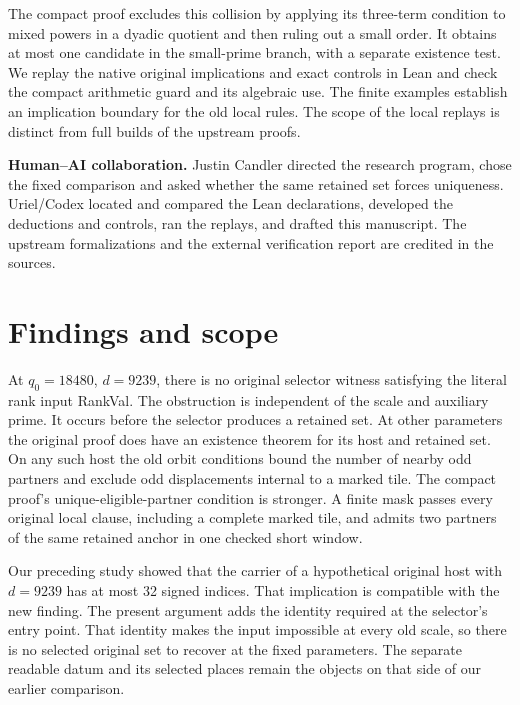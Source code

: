 \documentclass[12pt,letterpaper]{article}
\DeclareRobustCommand{\id}[1]{\mbox{\small\ttfamily #1}}
\begin{document}
The compact proof excludes this collision by applying its three-term condition to mixed powers in a dyadic quotient and then ruling out a small order. It obtains at most one candidate in the small-prime branch, with a separate existence test. We replay the native original implications and exact controls in Lean and check the compact arithmetic guard and its algebraic use. The finite examples establish an implication boundary for the old local rules. The scope of the local replays is distinct from full builds of the upstream proofs.

\medskip
\textbf{Human--AI collaboration.} Justin Candler directed the research program, chose the fixed comparison and asked whether the same retained set forces uniqueness. Uriel/Codex located and compared the Lean declarations, developed the deductions and controls, ran the replays, and drafted this manuscript. The upstream formalizations and the external verification report are credited in the sources.
\clearpage
\begingroup\small\setlength{\parskip}{0pt}\tableofcontents\endgroup
\clearpage
{}
\section{Findings and scope}

At $q_0=18480$, $d=9239$, there is no original selector witness satisfying the literal rank input \id{RankVal}. The obstruction is independent of the scale and auxiliary prime. It occurs before the selector produces a retained set. At other parameters the original proof does have an existence theorem for its host and retained set. On any such host the old orbit conditions bound the number of nearby odd partners and exclude odd displacements internal to a marked tile. The compact proof's unique-eligible-partner condition is stronger. A finite mask passes every original local clause, including a complete marked tile, and admits two partners of the same retained anchor in one checked short window.

Our preceding study showed that the carrier of a hypothetical original host with $d=9239$ has at most 32 signed indices. That implication is compatible with the new finding. The present argument adds the identity required at the selector's entry point. That identity makes the input impossible at every old scale, so there is no selected original set to recover at the fixed parameters. The separate readable datum and its selected places remain the objects on that side of our earlier comparison.
\end{document}

